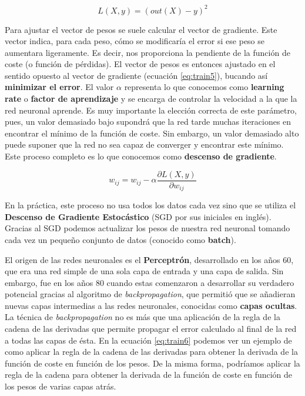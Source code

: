\documentclass[
  12pt,
  spanish,
  a4paperpaper,
]{report}
\begin{document}
\begin{equation} \label{eq:train4}
 L(X,y) = (out(X) - y)^2
\end{equation}

Para ajustar el vector de pesos se suele calcular el vector de
gradiente. Este vector indica, para cada peso, cómo se modificaría el
error si ese peso se aumentara ligeramente. Es decir, nos proporciona la
pendiente de la función de coste (o función de pérdidas). El vector de
pesos es entonces ajustado en el sentido opuesto al vector de gradiente
(ecuación \ref{eq:train5}), bucando así \textbf{minimizar el error}. El
valor \(\alpha\) representa lo que conocemos como \textbf{learning rate}
o \textbf{factor de aprendizaje} y se encarga de controlar la velocidad
a la que la red neuronal aprende. Es muy importante la elección correcta
de este parámetro, pues, un valor demasiado bajo supondrá que la red
tarde muchas iteraciones en encontrar el mínimo de la función de coste.
Sin embargo, un valor demasiado alto puede suponer que la red no sea
capaz de converger y encontrar este mínimo. Este proceso completo es lo
que conocemos como \textbf{descenso de gradiente}.

\begin{equation} \label{eq:train5}
 w_{ij} =  w_{ij} - \alpha\frac{\partial L(X,y)}{\partial w_{ij}}
\end{equation}

En la práctica, este proceso no usa todos los datos cada vez sino que se
utiliza el \textbf{Descenso de Gradiente Estocástico} (SGD por sus
iniciales en inglés). Gracias al SGD podemos actualizar los pesos de
nuestra red neuronal tomando cada vez un pequeño conjunto de datos
(conocido como \textbf{batch}).

El origen de las redes neuronales es el \textbf{Perceptrón},
desarrollado en los años 60, que era una red simple de una sola capa de
entrada y una capa de salida. Sin embargo, fue en los años 80 cuando
estas comenzaron a desarrollar su verdadero potencial gracias al
algoritmo de \emph{backpropagation}, que permitió que se añadieran
nuevas capas intermedias a las redes neuronales, conocidas como
\textbf{capas ocultas}. La técnica de \emph{backpropagation} no es más
que una aplicación de la regla de la cadena de las derivadas que permite
propagar el error calculado al final de la red a todas las capas de
ésta. En la ecuación \ref{eq:train6} podemos ver un ejemplo de como
aplicar la regla de la cadena de las derivadas para obtener la derivada
de la función de coste en función de los pesos. De la misma forma,
podríamos aplicar la regla de la cadena para obtener la derivada de la
función de coste en función de los pesos de varias capas atrás.
\end{document}
